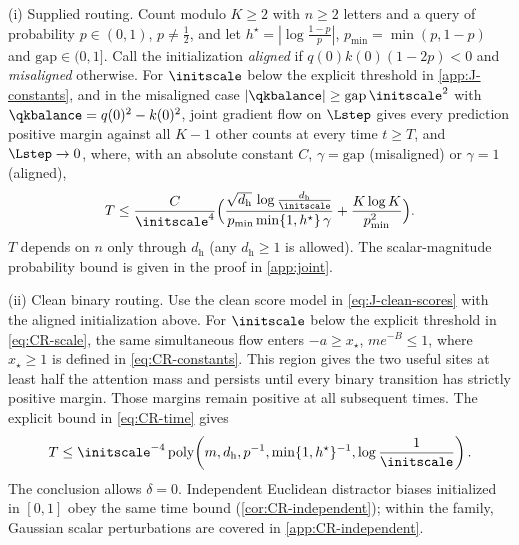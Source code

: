 \begin{theorem}
\label{thm:joint}
\textnormal{(i) Supplied routing.} Count modulo $K\ge2$ with $n\ge2$ letters and a query of probability $p\in(0,1)$, $p\neq\tfrac{1}{2}$, and let $h^\star=|\log\tfrac{1-p}{p}|$,
$p_{\min}=\min(p,1-p)$ and $\mathrm{gap}\in(0,1]$. Call the initialization \emph{aligned} if $q(0)k(0)(1-2p)<0$ and \emph{misaligned} otherwise.
For $\initscale$ below the explicit threshold in \cref{app:J-constants}, and in the misaligned case
$|\qkbalance|\ge\mathrm{gap}\,\initscale^2$ with $\qkbalance=q(0)^2-k(0)^2$, joint gradient flow on $\Lstep$ gives
every prediction positive margin against all $K-1$ other counts at every time $t\ge T$, and $\Lstep\to0$, where, with an absolute constant $C$,
$\gamma=\mathrm{gap}$ (misaligned) or $\gamma=1$ (aligned),
\[
 T\le\frac{C}{\initscale^4}\Bigl(\frac{\sqrt{d_{\mathrm h}}\,\log\frac{d_{\mathrm h}}{\initscale}}{p_{\min}\min\{1,h^\star\}\,\gamma}+\frac{K\log K}{p_{\min}^2}\Bigr).
\]
$T$ depends on $n$ only through $d_{\mathrm h}$ (any $d_{\mathrm h}\ge1$ is allowed).
The scalar-magnitude probability bound is given in the proof in \cref{app:joint}.

\textnormal{(ii) Clean binary routing.} Use the clean score model in \cref{eq:J-clean-scores} with the aligned initialization above.
For $\initscale$ below the explicit threshold in \cref{eq:CR-scale}, the same simultaneous flow
enters $-a\ge x_\star$, $me^{-B}\le1$, where $x_\star\ge1$ is defined in \cref{eq:CR-constants}.
This region gives the two useful sites at least half the attention mass and persists until every binary transition has
strictly positive margin. Those margins remain positive at all subsequent times. The explicit bound in \cref{eq:CR-time} gives
\[
 T\le\initscale^{-4}\operatorname{poly}\!\left(m,d_{\mathrm h},p^{-1},
 \min\{1,h^\star\}^{-1},\log\frac1{\initscale}\right).
\]
The conclusion allows $\delta=0$. Independent Euclidean distractor biases initialized in $[0,1]$ obey the same time bound
(\cref{cor:CR-independent}); within the family, Gaussian scalar perturbations are covered in \cref{app:CR-independent}.
\end{theorem}

